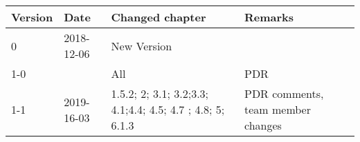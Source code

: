 \begin{longtable}{|p{1.5cm}|p{2cm}|p{6cm}|p{3cm}|}\hline
\centering
\textbf{Version} & \textbf{Date} & \textbf{Changed chapter} & \textbf{Remarks}  \\\hline
0       & 2018-12-06 	& New Version 	&          				\\\hline
1-0   	&  				& All         	& PDR      				\\\hline

1-1		& 2019-16-03	& 1.5.2; 2; 3.1; 3.2;3.3; 4.1;4.4; 4.5; 4.7 ; 4.8; 5; 6.1.3		& PDR comments, team member changes 			\\\hline

\end{longtable}           